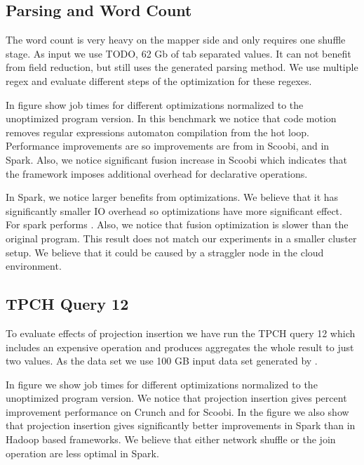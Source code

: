 \subsection{Parsing and Word Count}
\label{subsec:parsing-word-count}

The word count is very heavy on the mapper side and only requires one shuffle stage. As input we use TODO, 62 Gb of tab separated values. It can not benefit from field reduction, but still uses the generated parsing method. We use multiple regex and evaluate different steps of the optimization for these regexes.

In figure \todo{\ref{}} show job times for different optimizations normalized to the unoptimized program version. In this benchmark we notice that code motion removes regular expressions automaton compilation from the hot loop. Performance improvements are so improvements are from  in Scoobi,  and in Spark. Also, we notice significant fusion increase in Scoobi which indicates that the framework imposes additional overhead for declarative operations. 

In Spark, we notice larger benefits from optimizations. We believe that it has significantly smaller IO overhead so optimizations have more significant effect. For spark \tool performs . Also, we notice that fusion optimization is slower than the original program. This result does not match our experiments in a smaller cluster setup. We believe that it could be caused by a straggler node in the cloud environment.

\subsection{TPCH Query 12}
\label{subsec:tpch-query-12}

To evaluate effects of projection insertion we have run the TPCH query 12 which includes an expensive  operation and produces aggregates the whole result to just two values. As the data set we use 100 GB input data set generated by . 

In figure \todo{\ref{}} we show job times for different optimizations normalized to the unoptimized program version. We notice that projection insertion gives  percent improvement performance on Crunch and  for Scoobi. In the figure we also show that projection insertion gives significantly better improvements in Spark than in Hadoop based frameworks. We believe that either network shuffle or the join operation are less optimal in Spark. 


